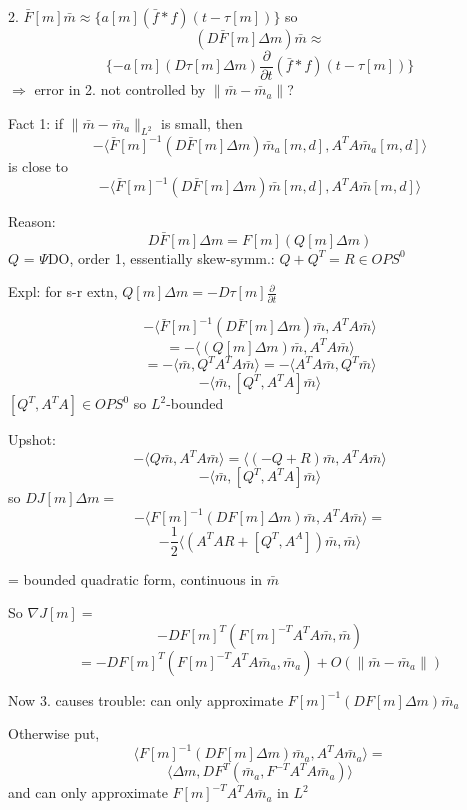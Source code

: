 \documentclass[xcolor=dvipsnames,20pt,aspectratio=169]{beamer}
\newcommand{\oF}{\bar{F}}
\newcommand{\om}{\bar{m}}
\begin{document}
\begin{frame}

2. $\oF[m]\om \approx \{a[m](\bar{f}*f)(t-\tau[m])\}$ so
\[
(D\oF[m]\Delta m)\om \approx 
\]
\[
\{-a[m](D\tau[m]\Delta m) \frac{\partial}{\partial t}(\bar{f}*f)(t-\tau[m])\}
\]
$\Rightarrow$ error in 2. not controlled by $\|\om-\om_a\|$?
\end{frame}

\begin{frame}
Fact 1: if $\|\om-\om_a\|_{L^2}$ is small, then 
\[
-\langle \oF[m]^{-1}(D\oF[m]\Delta m)\om_a[m,d],A^TA\om_a[m,d]\rangle
\]
is close to
\[
-\langle \oF[m]^{-1}(D\oF[m]\Delta m)\om[m,d],A^TA\om[m,d]\rangle
\]
\end{frame}

\begin{frame}
Reason: 
\[
D\oF[m] \Delta m= F[m](Q[m]\Delta m)
\]
$Q$ = $\Psi$DO, order 1, essentially skew-symm.: $Q+Q^T = R \in OPS^0$

Expl: for s-r extn, $Q[m]\Delta m = -D\tau[m]\frac{\partial}{\partial t}$
\end{frame}

\begin{frame}
\[
-\langle \oF[m]^{-1}(D\oF[m]\Delta m)\om,A^TA\om\rangle
\]
\[
=-\langle (Q[m]\Delta m)\om,A^TA\om\rangle 
\]
\[
= -\langle \om,Q^TA^TA\om\rangle = -\langle A^TA\om, Q^T \om \rangle 
\]
\[
- \langle\om, [Q^T,A^TA]\om\rangle
\]
$[Q^T,A^TA] \in OPS^0$ so $L^2$-bounded
\end{frame}

\begin{frame}
Upshot:
\[
-\langle Q\om, A^TA\om\rangle = \langle (-Q + R)\om,A^TA\om\rangle
\]
\[
-\langle \om,[Q^T,A^TA]\om\rangle
\]
so $DJ[m]\Delta m = $
\[
-\langle F[m]^{-1}(DF[m]\Delta m)\om, A^TA\om \rangle =
\]
\[
-\frac{1}{2}\langle (A^TAR + [Q^T,A^A])\om,\om\rangle
\]
\end{frame}

\begin{frame}
= bounded quadratic form, continuous in $\om$

So $\nabla J[m] =$
\[
-DF[m]^T(F[m]^{-T}A^TA\om,\om)
\]
\[
=-DF[m]^T(F[m]^{-T}A^TA\om_a,\om_a) + O(\|\om-\om_a\|)
\]
\end{frame}

\begin{frame}
Now 3. causes trouble: can only approximate $F[m]^{-1}(DF[m]\Delta m)\om_a$

Otherwise put,
\[
\langle F[m]^{-1}(DF[m]\Delta m)\om_a,A^TA\om_a \rangle = 
\]
\[
\langle \Delta m, DF^{T}(\om_a,F^{-T}A^TA\om_a)\rangle
\]
and can only approximate $F[m]^{-T}A^TA\om_a$ in $L^2$ 
\end{frame}
\end{document}
